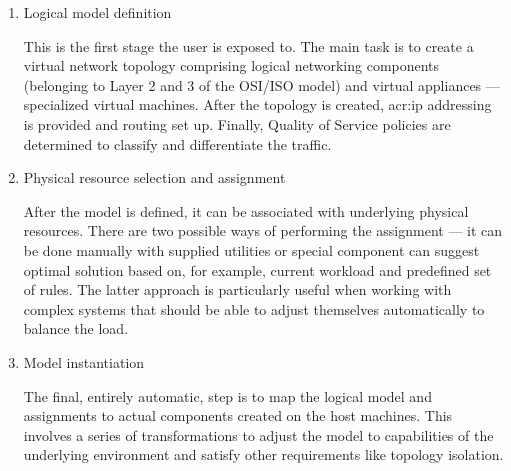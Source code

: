 \documentclass[11pt]{book}
\begin{document}
          \begin{enumerate}

            \item Logical model definition

              This is the first stage the user is exposed to. The main task is to create a virtual network topology
              comprising logical networking components (belonging to Layer 2 and 3 of the \mbox{OSI/ISO} model) and
              virtual appliances --- specialized virtual machines. After the topology is created, \gls{acr:ip} addressing is
              provided and routing set up. Finally, Quality of Service policies are determined to classify and
              differentiate the traffic.

            \item Physical resource selection and assignment

              After the model is defined, it can be associated with underlying physical resources. There are two
              possible ways of performing the assignment --- it can be done manually with supplied utilities or special
              component can suggest optimal solution based on, for example, current workload and predefined set of
              rules. The latter approach is particularly useful when working with complex systems that should be able to
              adjust themselves automatically to balance the load.

            \item Model instantiation

              The final, entirely automatic, step is to map the logical model and assignments to actual components
              created on the host machines. This involves a series of transformations to adjust the model to
              capabilities of the underlying environment and satisfy other requirements like topology isolation.
                  
          \end{enumerate}
\end{document}
